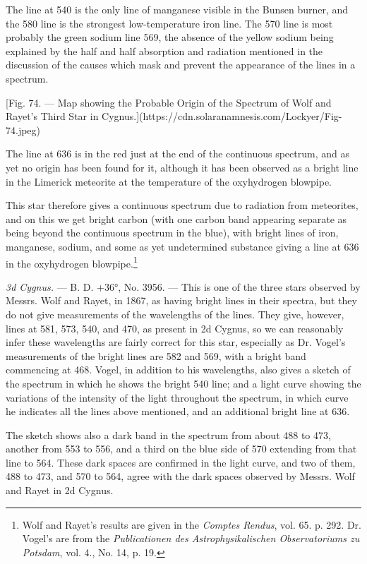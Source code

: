 \documentclass[a4paper, 12pt, oneside, polutonikogreek, english]{article}
\begin{document}
The line at 540 is the only line of manganese visible in the Bunsen burner, and the 580 line is the strongest low-temperature iron line. The 570 line is most probably the green sodium line 569, the absence of the yellow sodium being explained by the half and half absorption and radiation mentioned in the discussion of the causes which mask and prevent the appearance of the lines in a spectrum.

[Fig. 74. --- Map showing the Probable Origin of the Spectrum of Wolf and Rayet's Third Star in Cygnus.](https://cdn.solaranamnesis.com/Lockyer/Fig-74.jpeg)

The line at 636 is in the red just at the end of the continuous spectrum, and as yet no origin has been found for it, although it has been observed as a bright line in the Limerick meteorite at the temperature of the oxyhydrogen blowpipe.

This star therefore gives a continuous spectrum due to radiation from meteorites, and on this we get bright carbon (with one carbon band appearing separate as being beyond the continuous spectrum in the blue), with bright lines of iron, manganese, sodium, and some as yet undetermined substance giving a line at 636 in the oxyhydrogen blowpipe.\footnote{Wolf and Rayet's results are given in the \emph{Comptes Rendus}, vol. 65. p. 292. Dr. Vogel's are from the \emph{Publicationen des Astrophysikalischen Observatoriums zu Potsdam}, vol. 4., No. 14, p. 19.}

\emph{3d Cygnus.} --- B. D. +36°, No. 3956. --- This is one of the three stars observed by Messrs. Wolf and Rayet, in 1867, as having bright lines in their spectra, but they do not give measurements of the wavelengths of the lines. They give, however, lines at 581, 573, 540, and 470, as present in 2d Cygnus, so we can reasonably infer these wavelengths are fairly correct for this star, especially as Dr. Vogel's measurements of the bright lines are 582 and 569, with a bright band commencing at 468. Vogel, in addition to his wavelengths, also gives a sketch of the spectrum in which he shows the bright 540 line; and a light curve showing the variations of the intensity of the light throughout the spectrum, in which curve he indicates all the lines above mentioned, and an additional bright line at 636.

The sketch shows also a dark band in the spectrum from about 488 to 473, another from 553 to 556, and a third on the blue side of 570 extending from that line to 564. These dark spaces are confirmed in the light curve, and two of them, 488 to 473, and 570 to 564, agree with the dark spaces observed by Messrs. Wolf and Rayet in 2d Cygnus.
\end{document}
